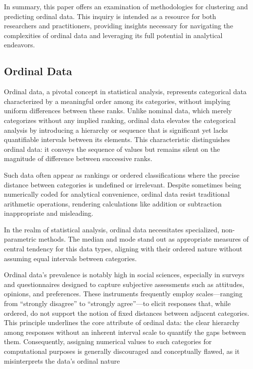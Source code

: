 \documentclass{article}
\begin{document}
In summary, this paper offers an examination of methodologies for
clustering and predicting ordinal data. This inquiry is intended as a
resource for both researchers and practitioners, providing insights
necessary for navigating the complexities of ordinal data and leveraging
its full potential in analytical endeavors.

\subsection{Ordinal Data}

Ordinal data, a pivotal concept in statistical analysis, represents categorical data characterized by a meaningful order among its categories, without implying uniform differences between these ranks. Unlike nominal data, which merely categorizes without any implied ranking, ordinal data elevates the categorical analysis by introducing a hierarchy or sequence that is significant yet lacks quantifiable intervals between its elements. This characteristic distinguishes ordinal data: it conveys the sequence of values but remains silent on the magnitude of difference between successive ranks.

Such data often appear as rankings or ordered classifications where the precise distance between categories is undefined or irrelevant. 
Despite sometimes being numerically coded for analytical convenience, ordinal data resist traditional arithmetic operations, rendering calculations like addition or subtraction inappropriate and misleading.

In the realm of statistical analysis, ordinal data necessitates specialized, non-parametric methods. 
The median and mode stand out as appropriate measures of central tendency for this data types, 
aligning with their ordered nature without assuming equal intervals between categories.

Ordinal data's prevalence is notably high in social sciences, especially in surveys and questionnaires designed to capture subjective assessments such as attitudes, opinions, and preferences. These instruments frequently employ scales—ranging from ``strongly disagree'' to ``strongly agree''—to elicit responses that, while ordered, do not support the notion of fixed distances between adjacent categories. This principle underlines the core attribute of ordinal data: the clear hierarchy among responses without an inherent interval scale to quantify the gaps between them. Consequently, assigning numerical values to such categories for computational purposes is generally discouraged and conceptually flawed, as it misinterprets the data's ordinal nature 
\end{document}
